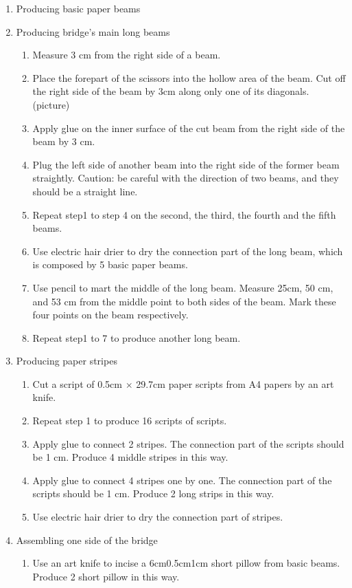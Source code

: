 \begin{enumerate}
\item Producing basic paper beams
\item Producing bridge’s main long beams
	\begin{enumerate}
	\item Measure 3 cm from the right side of a beam.
	\item Place the forepart of the scissors into the hollow area of the beam. Cut off the right side of the beam by 3cm along only one of its diagonals.
	(picture)
	\item Apply glue on the inner surface of the cut beam from the right side of the beam by 3 cm.
	\item Plug the left side of another beam into the right side of the former beam straightly. Caution: be careful with the direction of two beams, and they should be a straight line. 
	\item Repeat step1 to step 4 on the second, the third, the fourth and the fifth beams. 
	\item Use electric hair drier to dry the connection part of the long beam, which is composed by 5 basic paper beams. 
	\item Use pencil to mart the middle of the long beam. Measure 25cm, 50 cm, and 53 cm from the middle point to both sides of the beam. Mark these four points on the beam respectively. 
	\item Repeat step1 to 7 to produce another long beam. 
	\end{enumerate}
\item Producing paper stripes
	\begin{enumerate}
	\item Cut a script of 0.5cm $\times$ 29.7cm paper scripts from A4 papers by an art knife. 
	\item Repeat step 1 to produce 16 scripts of scripts.
	\item Apply glue to connect 2 stripes. The connection part of the scripts should be 1 cm. Produce 4 middle stripes in this way.
	\item Apply glue to connect 4 stripes one by one. The connection part of the scripts should be 1 cm. Produce 2 long strips in this way.
	\item Use electric hair drier to dry the connection part of stripes.
	\end{enumerate}
\item Assembling one side of the bridge
	\begin{enumerate}
	\item Use an art knife to incise a 6cm0.5cm1cm short pillow from basic beams. Produce 2 short pillow in this way. 

\end{enumerate}
\end{enumerate}
